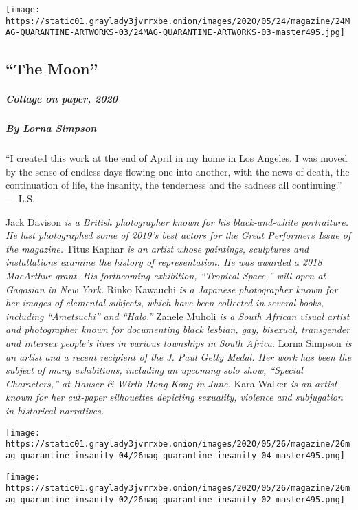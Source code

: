 \texttt{[image: https://static01.graylady3jvrrxbe.onion/images/2020/05/24/magazine/24MAG-QUARANTINE-ARTWORKS-03/24MAG-QUARANTINE-ARTWORKS-03-master495.jpg]}

\hypertarget{the-moon-1}{%
\subsection{``The Moon''}\label{the-moon-1}}

\hypertarget{collage-on-paper-2020-1}{%
\subparagraph{Collage on paper, 2020}\label{collage-on-paper-2020-1}}

\hypertarget{by-lorna-simpson-1}{%
\subparagraph{By Lorna Simpson}\label{by-lorna-simpson-1}}

``I created this work at the end of April in my home in Los Angeles. I
was moved by the sense of endless days flowing one into another, with
the news of death, the continuation of life, the insanity, the
tenderness and the sadness all continuing.'' --- L.S.

Jack Davison \emph{is a British photographer known for his
black-and-white portraiture. He last photographed some of 2019's best
actors for the Great Performers Issue of the magazine.} Titus Kaphar
\emph{is an artist whose paintings, sculptures and installations examine
the history of representation. He was awarded a 2018 MacArthur grant.
His forthcoming exhibition, ``Tropical Space,'' will open at Gagosian in
New York.} Rinko Kawauchi \emph{is a Japanese photographer known for her
images of elemental subjects, which have been collected in several
books, including ``Ametsuchi'' and ``Halo.''} Zanele Muholi \emph{is a
South African visual artist and photographer known for documenting black
lesbian, gay, bisexual, transgender and intersex people's lives in
various townships in South Africa.} Lorna Simpson \emph{is an artist and
a recent recipient of the J. Paul Getty Medal. Her work has been the
subject of many exhibitions, including an upcoming solo show, ``Special
Characters,'' at Hauser \& Wirth Hong Kong in June.} Kara Walker
\emph{is an artist known for her cut-paper silhouettes depicting
sexuality, violence and subjugation in historical narratives.}

\texttt{[image: https://static01.graylady3jvrrxbe.onion/images/2020/05/26/magazine/26mag-quarantine-insanity-04/26mag-quarantine-insanity-04-master495.png]}

\texttt{[image: https://static01.graylady3jvrrxbe.onion/images/2020/05/26/magazine/26mag-quarantine-insanity-02/26mag-quarantine-insanity-02-master495.png]}

